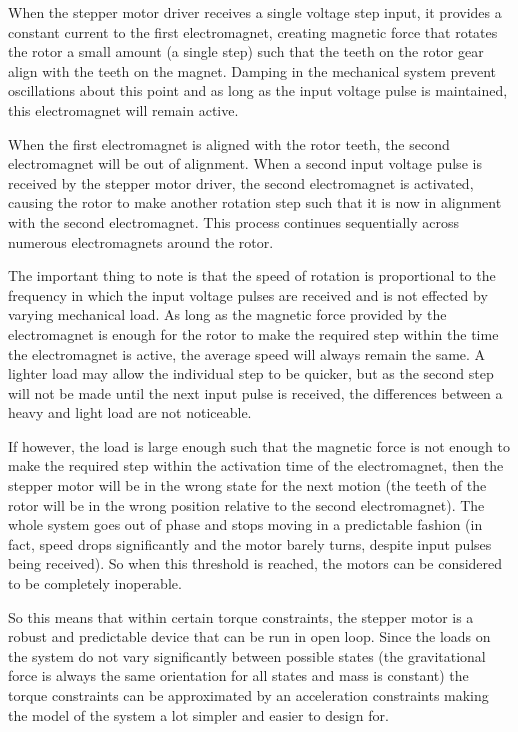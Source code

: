 		When the stepper motor driver receives a single voltage step input, it provides a constant current to the first electromagnet, creating magnetic force that rotates the rotor a small amount (a single step) such that the teeth on the rotor gear align with the teeth on the magnet. Damping in the mechanical system prevent oscillations about this point and as long as the input voltage pulse is maintained, this electromagnet will remain active.
		
		When the first electromagnet is aligned with the rotor teeth, the second electromagnet will be out of alignment. When a second input voltage pulse is received by the stepper motor driver, the second electromagnet is activated, causing the rotor to make another rotation step such that it is now in alignment with the second electromagnet. This process continues sequentially across numerous electromagnets around the rotor.
		
		The important thing to note is that the speed of rotation is proportional to the frequency in which the input voltage pulses are received and is not effected by varying mechanical load. As long as the magnetic force provided by the electromagnet is enough for the rotor to make the required step within the time the electromagnet is active, the average speed will always remain the same. A lighter load may allow the individual step to be quicker, but as the second step will not be made until the next input pulse is received, the differences between a heavy and light load are not noticeable.
		
		If however, the load is large enough such that the magnetic force is not enough to make the required step within the activation time of the electromagnet, then the stepper motor will be in the wrong state for the next motion (the teeth of the rotor will be in the wrong position relative to the second electromagnet). The whole system goes out of phase and stops moving in a predictable fashion (in fact, speed drops significantly and the motor barely turns, despite input pulses being received). So when this threshold is reached, the motors can be considered to be completely inoperable.
		
		So this means that within certain torque constraints, the stepper motor is a robust and predictable device that can be run in open loop. Since the loads on the system do not vary significantly between possible states (the gravitational force is always the same orientation for all states and mass is constant) the torque constraints can be approximated by an acceleration constraints making the model of the system a lot simpler and easier to design for.